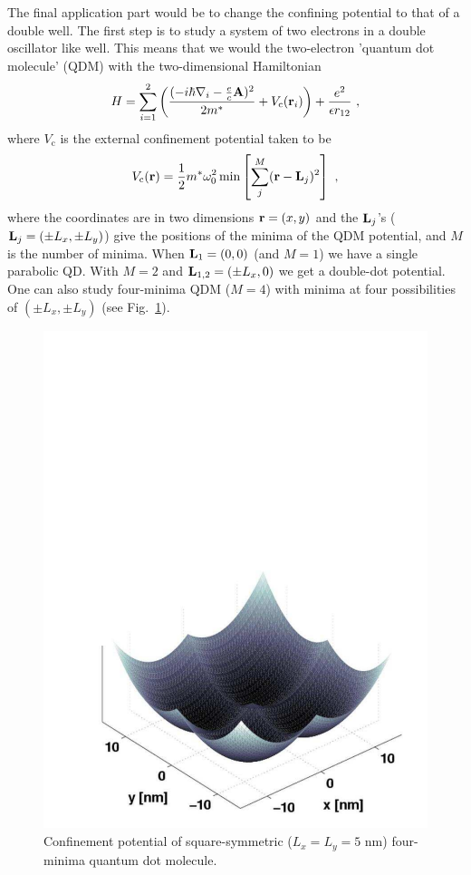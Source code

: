 \documentclass[twocolumn]{revtex4}
\begin{document}
The final application part would be to change the confining potential to that of a double well. The first step
is to study a system of two electrons in a double oscillator like well. 
This means that we would the two-electron 'quantum dot molecule' (QDM)  with the two-dimensional Hamiltonian
\begin{equation}
H = \sum _{i=1}^2\left ( \frac{ ( {- i {\hbar} \nabla_i}
-\frac ec \mathbf{A})^2 }{2 m^{*}} + V_\mathrm{c}({\bf
r}_{i}) \right ) +  \frac {e^{2}}{ \epsilon   r_{12} } \ ,
\label{ham}
\end{equation}
where $V_\mathrm{c}$ is the external confinement potential
taken to be
\begin{equation}
 V_\mathrm{c}({\bf r}) = \frac 12 m^* \omega_0^2 \min \left[
 \sum_j^M ({\bf r} - {\bf L}_j)^2 \right] \ ,
\label{Vc}
\end{equation}
where the coordinates are in two dimensions ${\bf r} = (x,y)$ and the ${\bf
L}_j$'s (${\bf L}_j = (\pm L_x, \pm L_y)$) give the positions of the
minima of the QDM potential, and $M$ is the number of minima. When
${\bf L}_1=(0,0)$ (and $M=1$) we have a single parabolic QD. With
$M=2$ and ${\bf L}_{1,2} = (\pm L_x,0)$ we get a double-dot
potential. One can also study four-minima QDM ($M=4$) with minima at four
possibilities of $(\pm L_x,\pm L_y)$ (see Fig.~\ref{pot}).
%
\begin{figure}
\includegraphics*[width=1.0\columnwidth]{doublewell.pdf}
\caption{Confinement potential of square-symmetric ($L_x=L_y=5$ nm)
four-minima quantum dot molecule.}
\label{pot}
\end{figure}
\end{document}
